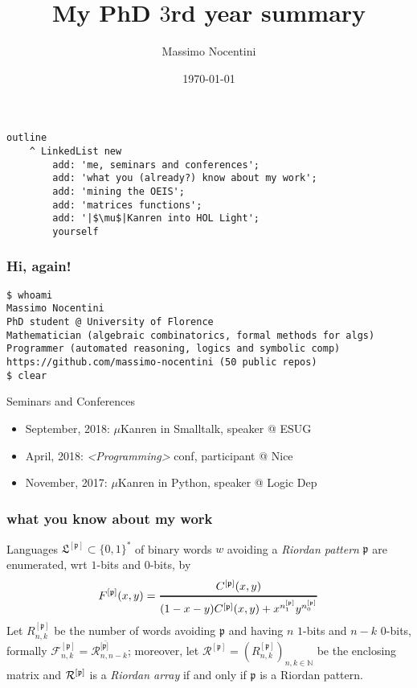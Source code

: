 \documentclass{beamer}
\title{My PhD $3$rd year summary}
\author{Massimo Nocentini}
\institute{University of Florence, Italy}
\date{\today}
\begin{document}
\frame{\titlepage}


\begin{frame}[fragile]
\frametitle{}
\begin{verbatim}
outline
    ^ LinkedList new
        add: 'me, seminars and conferences';
        add: 'what you (already?) know about my work';
        add: 'mining the OEIS';
        add: 'matrices functions';
        add: '|$\mu$|Kanren into HOL Light'; 
        yourself
\end{verbatim}
\end{frame}


\begin{frame}[fragile]
\frametitle{Hi, again!}
\begin{Verbatim}[fontsize=\small]
$ whoami
Massimo Nocentini
PhD student @ University of Florence
Mathematician (algebraic combinatorics, formal methods for algs)
Programmer (automated reasoning, logics and symbolic comp)
https://github.com/massimo-nocentini (50 public repos)
$ clear
\end{Verbatim}

\begin{block}{Seminars and Conferences}
\begin{itemize}
\item September, 2018: $\mu$Kanren in Smalltalk, speaker @ ESUG
\item April, 2018: \textit{<Programming>} conf, participant @ Nice
\item November, 2017: $\mu$Kanren in Python, speaker @ Logic Dep 
\end{itemize}
\end{block}

\end{frame}


\begin{frame}[fragile]
\frametitle{what you know about my work}

Languages $\mathfrak{L}^{[\mathfrak{p}]}\subset \{0,1\}^*$ of binary words $w$
avoiding a \textit{Riordan pattern} $\mathfrak{p}$ are enumerated,
wrt $1$-bits and $0$-bits, by
$$F^{[\mathfrak{p}]}(x,y)
=\genfrac{}{}{1pt}{0}{C^{[\mathfrak{p}]}(x,y)}{(1-x-y)C^{[\mathfrak{p}]}(x,y)
+x^{n_1^{[\mathfrak{p}]}}y^{n_0^{[\mathfrak{p}]}}}$$
Let $R_{n,k}^{[\mathfrak{p}]}$ be the number of words avoiding $\mathfrak{p}$
and having $n$ $1$-bits  and $n-k$  $0$-bits, formally 
${\mathcal{F}_{n,k}^{[\mathfrak{p}]}} = {\mathcal{R}_{n,
n-k}^{[\bar{\mathfrak{p}]}}}$; moreover, let
$\mathcal{R}^{[\mathfrak{p}]}=\left(R_{n,k}^{[\mathfrak{p}]}\right)_{n,k\in\mathbb{N}}$
be the enclosing matrix and ${\cal{R}^{[\mathfrak{p}]}}$ is a
\textit{Riordan array} if and only if  $\mathfrak{p}$ is a Riordan pattern.

\end{frame}
\end{document}
